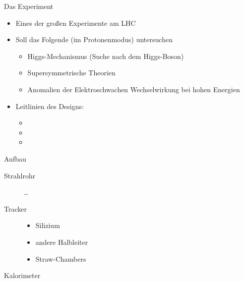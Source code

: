 \documentclass{beamer}
\begin{document}
\begin{frame}{Das Experiment}
  \begin{itemize}
    \item Eines der großen Experimente am LHC
    \item Soll das Folgende (im Protonenmodus) untersuchen
      \begin{itemize}
        \item Higgs-Mechanismus (Suche nach dem Higgs-Boson)
        \item Supersymmetrische Theorien
        \item Anomalien der Elektroschwachen Wechselwirkung bei hohen Energien
      \end{itemize}
    \item Leitlinien des Designs:
      \begin{itemize}
        \item
        \item
        \item
      \end{itemize}
  \end{itemize}
\end{frame}

\begin{frame}{Aufbau}
  \begin{description}
    \item[Strahlrohr] \dots
    \item[Tracker]
      \begin{itemize}
        \item Silizium
        \item andere Halbleiter
        \item Straw-Chambers
      \end{itemize}
    \item[Kalorimeter]
  \end{description}
\end{frame}
\end{document}
